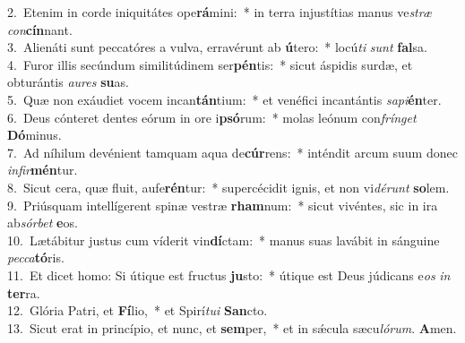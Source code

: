 {2.~}Etenim in corde iniquitátes ope\textbf{rá}mini:~* in terra injustítias manus ve\textit{stræ} \textit{con}\textbf{cín}nant.\\
{3.~}Alienáti sunt peccatóres a vulva, erravérunt ab \textbf{ú}tero:~* locú\textit{ti} \textit{sunt} \textbf{fal}sa.\\
{4.~}Furor illis secúndum similitúdinem ser\textbf{pén}tis:~* sicut áspidis surdæ, et obturántis \textit{au}\textit{res} \textbf{su}as.\\
{5.~}Quæ non exáudiet vocem incan\textbf{tán}tium:~* et venéfici incantántis \textit{sa}\textit{pi}\textbf{én}ter.\\
{6.~}Deus cónteret dentes eórum in ore i\textbf{psó}rum:~* molas leónum con\textit{frín}\textit{get} \textbf{Dó}minus.\\
{7.~}Ad níhilum devénient tamquam aqua de\textbf{cúr}rens:~* inténdit arcum suum donec \textit{in}\textit{fir}\textbf{mén}tur.\\
{8.~}Sicut cera, quæ fluit, aufe\textbf{rén}tur:~* supercécidit ignis, et non vi\textit{dé}\textit{runt} \textbf{so}lem.\\
{9.~}Priúsquam intellígerent spinæ vestræ \textbf{rham}num:~* sicut vivéntes, sic in ira ab\textit{sór}\textit{bet} \textbf{e}os.\\
{10.~}Lætábitur justus cum víderit vin\textbf{dí}ctam:~* manus suas lavábit in sánguine \textit{pec}\textit{ca}\textbf{tó}ris.\\
{11.~}Et dicet homo: Si útique est fructus \textbf{ju}sto:~* útique est Deus júdicans e\textit{os} \textit{in} \textbf{ter}ra.\\
{12.~}Glória Patri, et \textbf{Fí}lio,~* et Spirí\textit{tu}\textit{i} \textbf{San}cto.\\
{13.~}Sicut erat in princípio, et nunc, et \textbf{sem}per,~* et in sǽcula sæcu\textit{ló}\textit{rum}. \textbf{A}men.\\
